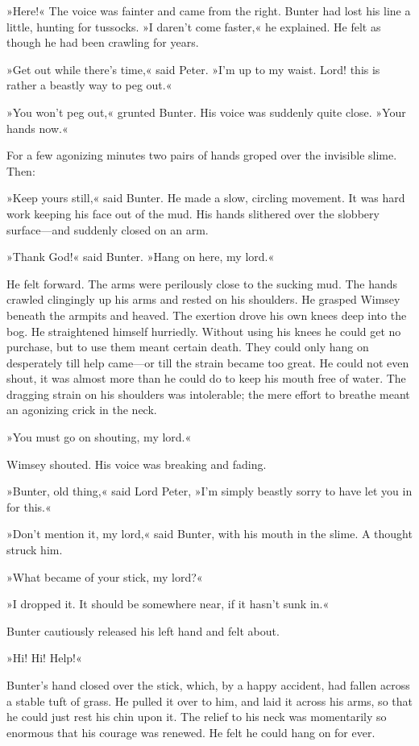 »Here!« The voice was fainter and came from the right. Bunter had lost his line a little, hunting for tussocks. »I daren't come faster,« he explained. He felt as though he had been crawling for years.

»Get out while there's time,« said Peter. »I'm up to my waist. Lord!  this is rather a beastly way to peg out.«

»You won't peg out,« grunted Bunter. His voice was suddenly quite close. »Your hands now.«

For a few agonizing minutes two pairs of hands groped over the invisible slime. Then:

»Keep yours still,« said Bunter. He made a slow, circling movement. It was hard work keeping his face out of the mud. His hands slithered over the slobbery surface\allowbreak---\allowbreak and suddenly closed on an arm.

»Thank God!« said Bunter. »Hang on here, my lord.«

He felt forward. The arms were perilously close to the sucking mud. The hands crawled clingingly up his arms and rested on his shoulders. He grasped Wimsey beneath the armpits and heaved. The exertion drove his own knees deep into the bog. He straightened himself hurriedly. Without using his knees he could get no purchase, but to use them meant certain death. They could only hang on desperately till help came\allowbreak---\allowbreak or till the strain became too great. He could not even shout, it was almost more than he could do to keep his mouth free of water. The dragging strain on his shoulders was intolerable; the mere effort to breathe meant an agonizing crick in the neck.

»You must go on shouting, my lord.«

Wimsey shouted. His voice was breaking and fading.

»Bunter, old thing,« said Lord Peter, »I'm simply beastly sorry to have let you in for this.«

»Don't mention it, my lord,« said Bunter, with his mouth in the slime.  A thought struck him.

»What became of your stick, my lord?«

»I dropped it. It should be somewhere near, if it hasn't sunk in.«

Bunter cautiously released his left hand and felt about.

»Hi! Hi! Help!«

Bunter's hand closed over the stick, which, by a happy accident, had fallen across a stable tuft of grass. He pulled it over to him, and laid it across his arms, so that he could just rest his chin upon it.  The relief to his neck was momentarily so enormous that his courage was renewed. He felt he could hang on for ever.

